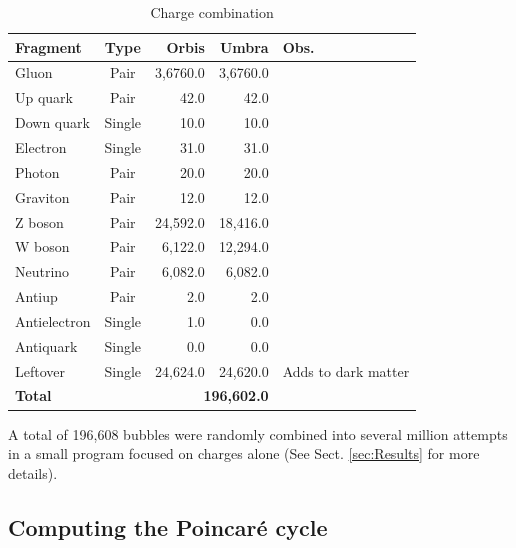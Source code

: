 \documentclass[12pt,english]{article}
\begin{document}
\begin{table}
\caption{Charge combination}

\medskip{}
\label{combina}
\begin{centering}
{\small{}}%
\begin{tabular}{|l|c|r|r|l|}
\hline 
\textbf{\small{}Fragment} & \textbf{\small{}Type} & \textbf{\small{}Orbis} & \textbf{Umbra} & \textbf{\small{}Obs.}\tabularnewline
\hline 
\hline 
{\small{}Gluon} & {\small{}Pair} & {\small{}3,6760.0} & {\small{}3,6760.0} & \tabularnewline
\hline 
{\small{}Up quark} & {\small{}Pair} & {\small{}42.0} & {\small{}42.0} & \tabularnewline
\hline 
{\small{}Down quark} & {\small{}Single} & {\small{}10.0} & {\small{}10.0} & \tabularnewline
\hline 
{\small{}Electron} & {\small{}Single} & {\small{}31.0} & {\small{}31.0} & \tabularnewline
\hline 
{\small{}Photon} & {\small{}Pair} & {\small{}20.0} & {\small{}20.0} & \tabularnewline
\hline 
{\small{}Graviton} & {\small{}Pair} & {\small{}12.0} & {\small{}12.0} & \tabularnewline
\hline 
{\small{}Z boson} & {\small{}Pair} & {\small{}24,592.0} & {\small{}18,416.0} & \tabularnewline
\hline 
{\small{}W boson} & {\small{}Pair} & {\small{}6,122.0} & {\small{}12,294.0} & \tabularnewline
\hline 
{\small{}Neutrino} & {\small{}Pair} & {\small{}6,082.0} & {\small{}6,082.0} & \tabularnewline
\hline 
{\small{}Antiup} & {\small{}Pair} & {\small{}2.0} & {\small{}2.0} & \tabularnewline
\hline 
{\small{}Antielectron} & {\small{}Single} & {\small{}1.0} & {\small{}0.0} & \tabularnewline
\hline 
{\small{}Antiquark} & {\small{}Single} & {\small{}0.0} & {\small{}0.0} & \tabularnewline
\hline 
{\small{}Leftover} & {\small{}Single} & {\small{}24,624.0} & {\small{}24,620.0} & {\small{}Adds to dark matter}\tabularnewline
\hline 
\textbf{\small{}Total} &  & \multicolumn{2}{r|}{\textbf{\small{}196,602.0 }} & \tabularnewline
\hline 
\end{tabular}{\small\par}
\par\end{centering}
\medskip{}

{\small{}A total of 196,608 bubbles were randomly combined into several million attempts in a small program focused on charges alone (See Sect. \ref{sec:Results} for more details).}{\small\par}
\end{table}


\subsection{Computing the Poincaré cycle}
\end{document}
